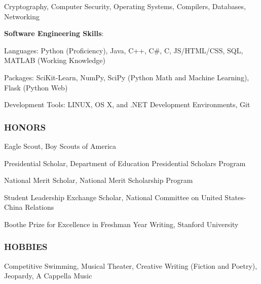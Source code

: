 \documentclass[11pt,letterpaper]{article}%
\begin{document}
\hspace{2.4em}
Cryptography, 
Computer Security,
Operating Systems,
Compilers,
Databases,
Networking


\hspace{.6em}
{\bf Software Engineering Skills}:

\hspace{2.4em} 
Languages: Python (Proficiency), Java, C++, C\#, C, JS/HTML/CSS, SQL, MATLAB (Working Knowledge)

\hspace{2.4em} 
Packages: SciKit-Learn, NumPy, SciPy (Python Math and Machine Learning), Flask (Python Web)

\hspace{2.4em} Development Tools: LINUX, OS X, and .NET Development Environments, Git

\vspace{.5em}
\subsubsection*{HONORS}
\vspace{-2ex}
\hrulefill
\vspace{-1.5ex}

\begin{itemize*}
\item Eagle Scout, Boy Scouts of America
\item Presidential Scholar, Department of Education Presidential Scholars Program
\item National Merit Scholar, National Merit Scholarship Program
\item Student Leadership Exchange Scholar, National Committee on United States-China Relations
\item Boothe Prize for Excellence in Freshman Year Writing, Stanford University
\end{itemize*}

\subsubsection*{HOBBIES}
\vspace{-2ex}
\hrulefill

\hspace{.6em}
Competitive Swimming, Musical Theater, Creative Writing (Fiction and Poetry), Jeopardy, A Cappella Music

\vspace{-.6em}
\end{document}
